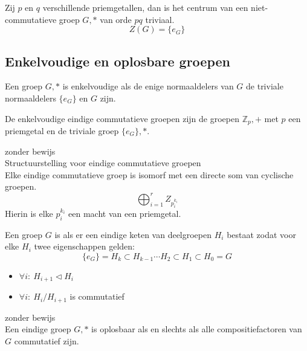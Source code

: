 \documentclass[main.tex]{subfiles}
\begin{document}
\begin{gev}
  Zij $p$ en $q$ verschillende priemgetallen, dan is het centrum van een niet-commutatieve groep $G,*$ van orde $pq$ triviaal.
  \[ Z(G) = \{ e_{G} \} \]
  
\end{gev}

\subsection{Enkelvoudige en oplosbare groepen}
\label{sec:enkelv-en-oplosb}

\begin{de}
  Een groep $G,*$ is enkelvoudige als de enige normaaldelers van $G$ de triviale normaaldelers $\{e_{G}\}$ en $G$ zijn.
\end{de}


\begin{pr}
  De enkelvoudige eindige commutatieve groepen zijn de groepen $\mathbb{Z}_{p},+$ met $p$ een priemgetal en de triviale groep $\{e_{G}\},*$.
  
\end{pr}

\begin{st}
  zonder bewijs\\
  Structuurstelling voor eindige commutatieve groepen\\
  Elke eindige commutatieve groep is isomorf met een directe som van cyclische groepen.
  \[ \bigoplus_{i=1}^{r} Z_{p_{i}^{k_{i}}} \]
  Hierin is elke $p_{i}^{k_{i}}$ een macht van een priemgetal.
\end{st}

\begin{de}
  Een groep $G$ is  als er een eindige keten van deelgroepen $H_{i}$ bestaat zodat voor elke $H_{i}$ twee eigenschappen gelden:
  \[ \{e_{G}\} = H_{k} \subset H_{k-1} \dotsb H_{2} \subset H_{1} \subset H_{0} = G \]
  \begin{itemize}
  \item $\forall i:\ H_{i+1} \triangleleft H_{i}$
  \item $\forall i:\ H_{i}/H_{i+1}$ is commutatief
  \end{itemize}
\end{de}

\begin{st}
  zonder bewijs\\
  Een eindige groep $G,*$ is oplosbaar als en slechts als alle compositiefactoren van $G$ commutatief zijn.
\end{st}
\end{document}
